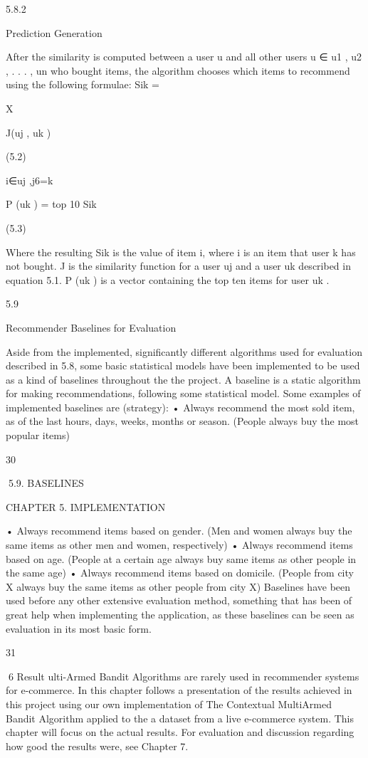 5.8.2

Prediction Generation

After the similarity is computed between a user u and all other users u ∈ {u1 , u2 , . . . , un }
who bought items, the algorithm chooses which items to recommend using the following
formulae:
Sik =

X

J(uj , uk )

(5.2)

i∈uj ,j6=k

P (uk ) = top 10 Sik

(5.3)

Where the resulting Sik is the value of item i, where i is an item that user k has not
bought. J is the similarity function for a user uj and a user uk described in equation
5.1. P (uk ) is a vector containing the top ten items for user uk .

5.9

Recommender Baselines for Evaluation

Aside from the implemented, significantly different algorithms used for evaluation described in 5.8, some basic statistical models have been implemented to be used as a
kind of baselines throughout the the project. A baseline is a static algorithm for making recommendations, following some statistical model. Some examples of implemented
baselines are (strategy):
• Always recommend the most sold item, as of the last hours, days, weeks, months
or season. (People always buy the most popular items)

30

5.9. BASELINES

CHAPTER 5. IMPLEMENTATION

• Always recommend items based on gender. (Men and women always buy the same
items as other men and women, respectively)
• Always recommend items based on age. (People at a certain age always buy same
items as other people in the same age)
• Always recommend items based on domicile. (People from city X always buy the
same items as other people from city X)
Baselines have been used before any other extensive evaluation method, something that
has been of great help when implementing the application, as these baselines can be seen
as evaluation in its most basic form.

31

6
Result
ulti-Armed Bandit Algorithms are rarely used in recommender systems
for e-commerce. In this chapter follows a presentation of the results achieved
in this project using our own implementation of The Contextual MultiArmed Bandit Algorithm applied to the a dataset from a live e-commerce
system. This chapter will focus on the actual results. For evaluation and discussion
regarding how good the results were, see Chapter 7.

